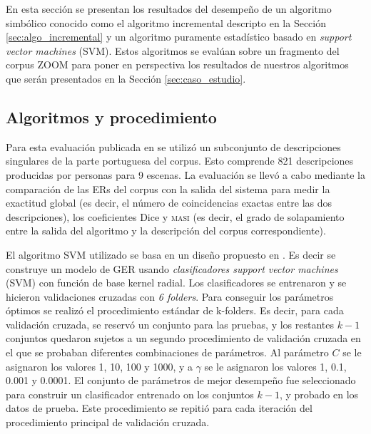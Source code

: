 En esta secci\'on se presentan los resultados del desempe\~no de un algoritmo simb\'olico conocido como el algoritmo incremental descripto en la Secci\'on \ref{sec:algo_incremental} y un algoritmo puramente estad\'istico basado en \emph{support vector machines} (SVM). Estos algoritmos se eval\'uan sobre un fragmento del corpus ZOOM para poner en perspectiva los resultados de nuestros algoritmos que ser\'an presentados en la Secci\'on \ref{sec:caso_estudio}.
\subsection{Algoritmos y procedimiento}

Para esta evaluaci\'on publicada en \cite{DBLP:conf/acl/AltamiranoFPB15} se utiliz\'o un subconjunto de descripciones singulares de la parte portuguesa del corpus. Esto comprende 821 descripciones producidas por personas para 9 escenas. La evaluaci\'on se llev\'o a cabo mediante la comparaci\'on de las ERs del corpus con la salida del sistema para medir la exactitud global (es decir, el n\'umero de coincidencias exactas entre las dos descripciones), los coeficientes Dice \cite{dice} y \textsc{masi} \cite{masi} (es decir, el grado de solapamiento entre la salida del algoritmo y la descripci\'on del corpus correspondiente).

El algoritmo SVM utilizado se basa en un dise\~no propuesto en \cite{thiago-svm}. Es decir se construye un modelo de GER usando {\it clasificadores support vector machines} (SVM) con funci\'on de base kernel radial. Los clasificadores se entrenaron y se hicieron validaciones cruzadas con {\it 6 folders}. Para conseguir los par\'ametros \'optimos se realiz\'o el procedimiento est\'andar de k-folders. Es decir, para cada validaci\'on cruzada, se reserv\'o un conjunto para las pruebas, y los restantes $k-1$ conjuntos quedaron sujetos a un segundo procedimiento de validaci\'on cruzada en el que se probaban diferentes combinaciones de par\'ametros. Al par\'ametro $C$ se le asignaron los valores 1, 10, 100 y 1000, y a $\gamma$ se le asignaron los valores 1, 0.1, 0.001 y 0.0001. El conjunto de par\'ametros de mejor desempe\~no fue seleccionado para construir un clasificador entrenado on los conjuntos $k-1$, y probado en los datos de prueba. Este procedimiento se repiti\'o para cada iteraci\'on del procedimiento principal de validaci\'on cruzada.

